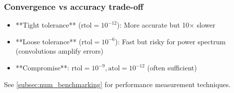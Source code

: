 \subsubsection{Convergence vs accuracy trade-off}

\begin{itemize}
    \item **Tight tolerance** ($\text{rtol} = 10^{-12}$): More accurate but 10× slower
    \item **Loose tolerance** ($\text{rtol} = 10^{-6}$): Fast but risky for power spectrum (convolutions amplify errors)
    \item **Compromise**: $\text{rtol} = 10^{-9}, \text{atol} = 10^{-12}$ (often sufficient)
\end{itemize}


See \cref{subsec:num_benchmarking} for performance measurement techniques.
